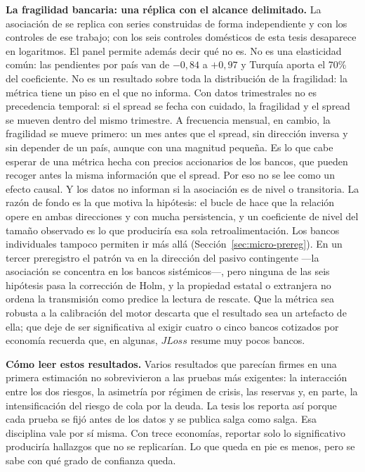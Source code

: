\textbf{La fragilidad bancaria: una réplica con el alcance delimitado.} La asociación de \citet{Chari2024b} se replica con series construidas de forma independiente y con los controles de ese trabajo; con los seis controles domésticos de esta tesis desaparece en logaritmos. El panel permite además decir qué no es. No es una elasticidad común: las pendientes por país van de $-0{,}84$ a $+0{,}97$ y Turquía aporta el 70\% del coeficiente. No es un resultado sobre toda la distribución de la fragilidad: la métrica tiene un piso en el que no informa. Con datos trimestrales no es precedencia temporal: si el spread se fecha con cuidado, la fragilidad y el spread se mueven dentro del mismo trimestre. A frecuencia mensual, en cambio, la fragilidad se mueve primero: un mes antes que el spread, sin dirección inversa y sin depender de un país, aunque con una magnitud pequeña. Es lo que cabe esperar de una métrica hecha con precios accionarios de los bancos, que pueden recoger antes la misma información que el spread. Por eso no se lee como un efecto causal. Y los datos no informan si la asociación es de nivel o transitoria. La razón de fondo es la que motiva la hipótesis: el bucle de \citet{FarhiTirole2018b} hace que la relación opere en ambas direcciones y con mucha persistencia, y un coeficiente de nivel del tamaño observado es lo que produciría esa sola retroalimentación. Los bancos individuales tampoco permiten ir más allá (Sección~\ref{sec:micro-prereg}). En un tercer preregistro el patrón va en la dirección del pasivo contingente ---la asociación se concentra en los bancos sistémicos---, pero ninguna de las seis hipótesis pasa la corrección de Holm, y la propiedad estatal o extranjera no ordena la transmisión como predice la lectura de rescate. Que la métrica sea robusta a la calibración del motor descarta que el resultado sea un artefacto de ella; que deje de ser significativa al exigir cuatro o cinco bancos cotizados por economía recuerda que, en algunas, $JLoss$ resume muy pocos bancos.

\textbf{Cómo leer estos resultados.} Varios resultados que parecían firmes en una primera estimación no sobrevivieron a las pruebas más exigentes: la interacción entre los dos riesgos, la asimetría por régimen de crisis, las reservas y, en parte, la intensificación del riesgo de cola por la deuda. La tesis los reporta así porque cada prueba se fijó antes de los datos y se publica salga como salga. Esa disciplina vale por sí misma. Con trece economías, reportar solo lo significativo produciría hallazgos que no se replicarían. Lo que queda en pie es menos, pero se sabe con qué grado de confianza queda.


